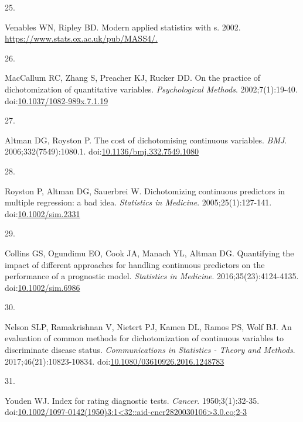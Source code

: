 \documentclass[
]{book}
\newlength{\cslhangindent}
\newlength{\csllabelwidth}
\newlength{\cslentryspacingunit} %
\newenvironment{CSLReferences}[2] %
 {%
  \setlength{\parindent}{0pt}
  \ifodd #1
  \let\oldpar\par
  \def\par{\hangindent=\cslhangindent\oldpar}
  \fi
  \setlength{\parskip}{#2\cslentryspacingunit}
 }%
 {}
\newcommand{\CSLLeftMargin}[1]{\parbox[t]{\csllabelwidth}{#1}}
\newcommand{\CSLRightInline}[1]{\parbox[t]{\linewidth - \csllabelwidth}{#1}\break}
\begin{document}
\begin{CSLReferences}{0}{0}
\leavevmode{}%
\CSLLeftMargin{25. }%
\CSLRightInline{Venables WN, Ripley BD. Modern applied statistics with s. 2002. \href{https://www.stats.ox.ac.uk/pub/MASS4/}{https://www.stats.ox.ac.uk/pub/MASS4/.}}

\leavevmode{}%
\CSLLeftMargin{26. }%
\CSLRightInline{MacCallum RC, Zhang S, Preacher KJ, Rucker DD. On the practice of dichotomization of quantitative variables. \emph{Psychological Methods}. 2002;7(1):19-40. doi:\href{https://doi.org/10.1037/1082-989x.7.1.19}{10.1037/1082-989x.7.1.19}}

\leavevmode{}%
\CSLLeftMargin{27. }%
\CSLRightInline{Altman DG, Royston P. The cost of dichotomising continuous variables. \emph{BMJ}. 2006;332(7549):1080.1. doi:\href{https://doi.org/10.1136/bmj.332.7549.1080}{10.1136/bmj.332.7549.1080}}

\leavevmode{}%
\CSLLeftMargin{28. }%
\CSLRightInline{Royston P, Altman DG, Sauerbrei W. Dichotomizing continuous predictors in multiple regression: a bad idea. \emph{Statistics in Medicine}. 2005;25(1):127-141. doi:\href{https://doi.org/10.1002/sim.2331}{10.1002/sim.2331}}

\leavevmode{}%
\CSLLeftMargin{29. }%
\CSLRightInline{Collins GS, Ogundimu EO, Cook JA, Manach YL, Altman DG. Quantifying the impact of different approaches for handling continuous predictors on the performance of a prognostic model. \emph{Statistics in Medicine}. 2016;35(23):4124-4135. doi:\href{https://doi.org/10.1002/sim.6986}{10.1002/sim.6986}}

\leavevmode{}%
\CSLLeftMargin{30. }%
\CSLRightInline{Nelson SLP, Ramakrishnan V, Nietert PJ, Kamen DL, Ramos PS, Wolf BJ. An evaluation of common methods for dichotomization of continuous variables to discriminate disease status. \emph{Communications in Statistics - Theory and Methods}. 2017;46(21):10823-10834. doi:\href{https://doi.org/10.1080/03610926.2016.1248783}{10.1080/03610926.2016.1248783}}

\leavevmode{}%
\CSLLeftMargin{31. }%
\CSLRightInline{Youden WJ. Index for rating diagnostic tests. \emph{Cancer}. 1950;3(1):32-35. doi:\href{https://doi.org/10.1002/1097-0142(1950)3:1\%3C32::aid-cncr2820030106\%3E3.0.co;2-3}{10.1002/1097-0142(1950)3:1\textless32::aid-cncr2820030106\textgreater3.0.co;2-3}}


\end{CSLReferences}
\end{document}
